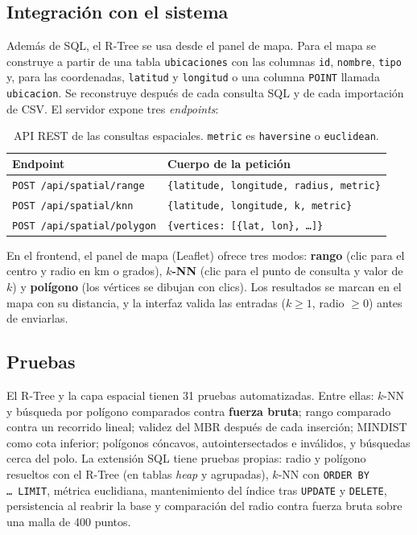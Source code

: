 \documentclass[11pt,a4paper]{article}
\begin{document}
\subsection{Integración con el sistema}

Además de SQL, el R-Tree se usa desde el panel de mapa. Para el mapa se construye a partir de una tabla \texttt{ubicaciones} con las columnas \texttt{id}, \texttt{nombre}, \texttt{tipo} y, para las coordenadas, \texttt{latitud} y \texttt{longitud} o una columna \texttt{POINT} llamada \texttt{ubicacion}. Se reconstruye después de cada consulta SQL y de cada importación de CSV. El servidor expone tres \emph{endpoints}:

\begin{table}[H]
  \centering
  \small
  \begin{tabular}{@{}ll@{}}
    \toprule
    \textbf{Endpoint} & \textbf{Cuerpo de la petición} \\
    \midrule
    \texttt{POST /api/spatial/range}   & \texttt{\{latitude, longitude, radius, metric\}} \\
    \texttt{POST /api/spatial/knn}     & \texttt{\{latitude, longitude, k, metric\}} \\
    \texttt{POST /api/spatial/polygon} & \texttt{\{vertices: [\{lat, lon\}, \dots]\}} \\
    \bottomrule
  \end{tabular}
  \caption{API REST de las consultas espaciales. \texttt{metric} es \texttt{haversine} o \texttt{euclidean}.}
\end{table}

En el frontend, el panel de mapa (Leaflet) ofrece tres modos: \textbf{rango} (clic para el centro y radio en km o grados), \textbf{$k$-NN} (clic para el punto de consulta y valor de $k$) y \textbf{polígono} (los vértices se dibujan con clics). Los resultados se marcan en el mapa con su distancia, y la interfaz valida las entradas ($k \ge 1$, radio $\ge 0$) antes de enviarlas.

\subsection{Pruebas}

El R-Tree y la capa espacial tienen 31 pruebas automatizadas. Entre ellas: $k$-NN y búsqueda por polígono comparados contra \textbf{fuerza bruta}; rango comparado contra un recorrido lineal; validez del MBR después de cada inserción; MINDIST como cota inferior; polígonos cóncavos, autointersectados e inválidos, y búsquedas cerca del polo. La extensión SQL tiene pruebas propias: radio y polígono resueltos con el R-Tree (en tablas \emph{heap} y agrupadas), $k$-NN con \texttt{ORDER BY \dots\ LIMIT}, métrica euclidiana, mantenimiento del índice tras \texttt{UPDATE} y \texttt{DELETE}, persistencia al reabrir la base y comparación del radio contra fuerza bruta sobre una malla de 400 puntos.
\end{document}
